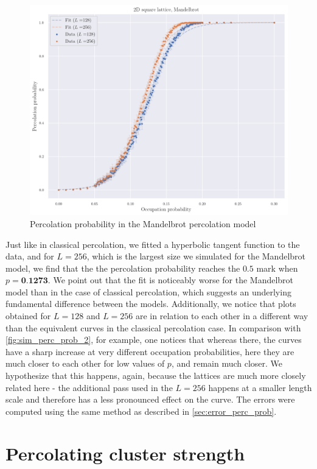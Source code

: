 \begin{figure}[H]
  \includegraphics[width=\linewidth]{Images/simm_perc_prob_2.png}
  \caption{Percolation probability in the Mandelbrot percolation model}
  \label{fig:simm_perc_prob_2}
\end{figure}

Just like in classical percolation, we fitted a hyperbolic tangent function to the data, and for $L=256$, which is the largest size we simulated for the Mandelbrot model, we find that the the percolation probability reaches the $0.5$ mark when $p=\textbf{0.1273}$. We point out that the fit is noticeably worse for the Mandelbrot model than in the case of classical percolation, which suggests an underlying fundamental difference between the models. Additionally, we notice that plots obtained for $L=128$ and $L=256$ are in relation to each other in a different way than the equivalent curves in the classical percolation case. In comparison with \autoref{fig:sim_perc_prob_2}, for example, one notices that whereas there, the curves have a sharp increase at very different occupation probabilities, here they are much closer to each other for low values of $p$, and remain much closer. We hypothesize that this happens, again, because the lattices are much more closely related here - the additional pass used in the $L=256$ happens at a smaller length scale and therefore has a less pronounced effect on the curve.
The errors were computed using the same method as described in \autoref{sec:error_perc_prob}.
\section{Percolating cluster strength}

